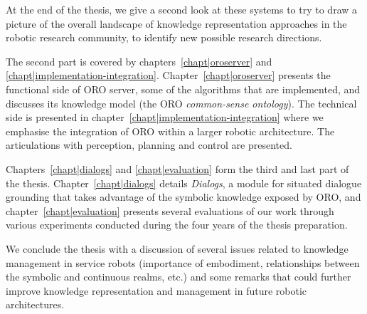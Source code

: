 At the end of the thesis, we give a second look at these systems to try to
draw a picture of the overall landscape of knowledge representation approaches
in the robotic research community, to identify new possible research directions.

The second part is covered by chapters~\ref{chapt|oroserver} and
\ref{chapt|implementation-integration}. Chapter~\ref{chapt|oroserver} presents
the functional side of ORO server, some of the algorithms that are
implemented, and discusses its knowledge model (the ORO \emph{common-sense
ontology}). The technical side is presented in
chapter~\ref{chapt|implementation-integration} where we emphasise the
integration of ORO within a larger robotic architecture. The articulations with
perception, planning and control are presented.

Chapters~\ref{chapt|dialogs} and \ref{chapt|evaluation} form the third and last
part of the thesis. Chapter~\ref{chapt|dialogs} details \emph{Dialogs}, a
module for situated dialogue grounding that takes advantage of the symbolic
knowledge exposed by ORO, and chapter~\ref{chapt|evaluation} presents
several evaluations of our work through various experiments conducted during
the four years of the thesis preparation.

We conclude the thesis with a discussion of several issues related to knowledge
management in service robots (importance of embodiment, relationships between
the symbolic and continuous realms, etc.) and some remarks that could further
improve knowledge representation and management in future robotic
architectures.

